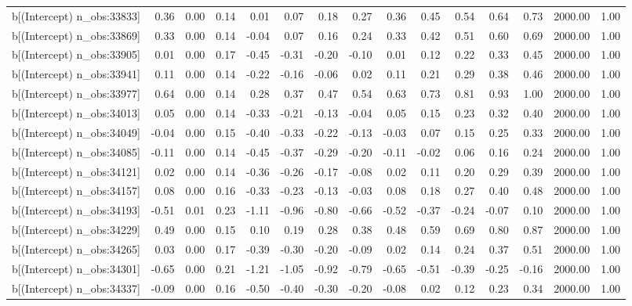 \begin{table}[ht]
\begin{tabular}{rrrrrrrrrrrrrrr}
  b[(Intercept) n\_obs:33833] & 0.36 & 0.00 & 0.14 & 0.01 & 0.07 & 0.18 & 0.27 & 0.36 & 0.45 & 0.54 & 0.64 & 0.73 & 2000.00 & 1.00 \\ 
  b[(Intercept) n\_obs:33869] & 0.33 & 0.00 & 0.14 & -0.04 & 0.07 & 0.16 & 0.24 & 0.33 & 0.42 & 0.51 & 0.60 & 0.69 & 2000.00 & 1.00 \\ 
  b[(Intercept) n\_obs:33905] & 0.01 & 0.00 & 0.17 & -0.45 & -0.31 & -0.20 & -0.10 & 0.01 & 0.12 & 0.22 & 0.33 & 0.45 & 2000.00 & 1.00 \\ 
  b[(Intercept) n\_obs:33941] & 0.11 & 0.00 & 0.14 & -0.22 & -0.16 & -0.06 & 0.02 & 0.11 & 0.21 & 0.29 & 0.38 & 0.46 & 2000.00 & 1.00 \\ 
  b[(Intercept) n\_obs:33977] & 0.64 & 0.00 & 0.14 & 0.28 & 0.37 & 0.47 & 0.54 & 0.63 & 0.73 & 0.81 & 0.93 & 1.00 & 2000.00 & 1.00 \\ 
  b[(Intercept) n\_obs:34013] & 0.05 & 0.00 & 0.14 & -0.33 & -0.21 & -0.13 & -0.04 & 0.05 & 0.15 & 0.23 & 0.32 & 0.40 & 2000.00 & 1.00 \\ 
  b[(Intercept) n\_obs:34049] & -0.04 & 0.00 & 0.15 & -0.40 & -0.33 & -0.22 & -0.13 & -0.03 & 0.07 & 0.15 & 0.25 & 0.33 & 2000.00 & 1.00 \\ 
  b[(Intercept) n\_obs:34085] & -0.11 & 0.00 & 0.14 & -0.45 & -0.37 & -0.29 & -0.20 & -0.11 & -0.02 & 0.06 & 0.16 & 0.24 & 2000.00 & 1.00 \\ 
  b[(Intercept) n\_obs:34121] & 0.02 & 0.00 & 0.14 & -0.36 & -0.26 & -0.17 & -0.08 & 0.02 & 0.11 & 0.20 & 0.29 & 0.39 & 2000.00 & 1.00 \\ 
  b[(Intercept) n\_obs:34157] & 0.08 & 0.00 & 0.16 & -0.33 & -0.23 & -0.13 & -0.03 & 0.08 & 0.18 & 0.27 & 0.40 & 0.48 & 2000.00 & 1.00 \\ 
  b[(Intercept) n\_obs:34193] & -0.51 & 0.01 & 0.23 & -1.11 & -0.96 & -0.80 & -0.66 & -0.52 & -0.37 & -0.24 & -0.07 & 0.10 & 2000.00 & 1.00 \\ 
  b[(Intercept) n\_obs:34229] & 0.49 & 0.00 & 0.15 & 0.10 & 0.19 & 0.28 & 0.38 & 0.48 & 0.59 & 0.69 & 0.80 & 0.87 & 2000.00 & 1.00 \\ 
  b[(Intercept) n\_obs:34265] & 0.03 & 0.00 & 0.17 & -0.39 & -0.30 & -0.20 & -0.09 & 0.02 & 0.14 & 0.24 & 0.37 & 0.51 & 2000.00 & 1.00 \\ 
  b[(Intercept) n\_obs:34301] & -0.65 & 0.00 & 0.21 & -1.21 & -1.05 & -0.92 & -0.79 & -0.65 & -0.51 & -0.39 & -0.25 & -0.16 & 2000.00 & 1.00 \\ 
  b[(Intercept) n\_obs:34337] & -0.09 & 0.00 & 0.16 & -0.50 & -0.40 & -0.30 & -0.20 & -0.08 & 0.02 & 0.12 & 0.23 & 0.34 & 2000.00 & 1.00 \\ 

\end{tabular}
\end{table}
